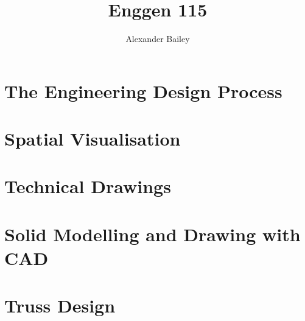 \documentclass[12pt]{article}
\begin{document}
\title{Enggen 115}
\author{Alexander Bailey}
\maketitle
\flushbottom

\section{The Engineering Design Process}
\section{Spatial Visualisation}
\section{Technical Drawings}
\section{Solid Modelling and Drawing with CAD}
\section{Truss Design}
\end{document}
